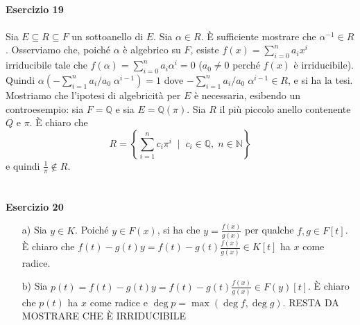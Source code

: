 \documentclass[12pt,a4paper]{report}
\theoremstyle{definition}
\begin{document}
\ 
\\
\noindent\textbf{Esercizio 19}\\
\\
Sia $E \subseteq R \subseteq F$ un sottoanello di $E$. Sia $\alpha \in R$. È sufficiente mostrare che $\alpha^{-1} \in R$. Osserviamo che, poiché $\alpha$ è algebrico su $F$, esiste $f(x)= \sum_{i=0}^n a_i x^i$ irriducibile tale che $f(\alpha)= \sum_{i=0}^n a_i \alpha^i = 0$ ($a_0 \neq 0$ perché $f(x)$ è irriducibile).\\
Quindi $\alpha (-\sum_{i=1}^n a_i/a_0 \; \alpha^{i-1})=1$ dove $-\sum_{i=1}^n a_i/a_0 \; \alpha^{i-1} \in R$, e si ha la tesi.\\
Mostriamo che l'ipotesi di algebricità per $E$ è necessaria, esibendo un controesempio: sia $F=\mathbb{Q}$ e sia $E=\mathbb{Q}(\pi)$. Sia $R$ il più piccolo anello contenente $Q$ e $\pi$. È chiaro che 
$$R=\left\{ \sum_{i=1}^n c_i \pi^i \; \mid \; c_i \in \mathbb{Q}, \; n \in \mathbb{N} \right\}$$
e quindi $\frac{1}{\pi} \not\in R$.
\\
\\
\\
\noindent\textbf{Esercizio 20}

\begin{itemize}
\item[a)] Sia $y \in K$. Poiché $y \in F(x)$, si ha che $y=\frac{f(x)}{g(x)}$ per qualche $f, g \in F[t]$. È chiaro che $f(t)-g(t) y=f(t)-g(t) \frac{f(x)}{g(x)} \in K[t]$ ha $x$ come radice.
\item[b)] Sia $p(t)=f(t)-g(t) y=f(t)-g(t) \frac{f(x)}{g(x)} \in F(y)[t]$. È chiaro che $p(t)$ ha $x$ come radice e $\deg p=\max(\deg f, \deg g)$. RESTA DA MOSTRARE CHE È IRRIDUCIBILE
\end{itemize}




 
\end{document}

